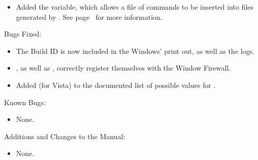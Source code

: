 \begin{itemize}

\item Added the  variable, which allows a file
  of commands to be inserted into  files generated
  by .  See page~\pageref{param:DAGManInsertSubFile}
  for more information.

\end{itemize}

\noindent Bugs Fixed:

\begin{itemize}

\item The Build ID is now included in the Windows'  print
      out, as well as the logs.

\item {}, as well as , correctly register 
      themselves with the Window Firewall.

\item Added  (for Vista) to the documented list of 
      possible values for .

\end{itemize}

\noindent Known Bugs:

\begin{itemize}

\item None.

\end{itemize}

\noindent Additions and Changes to the Manual:

\begin{itemize}

\item None.

\end{itemize}

